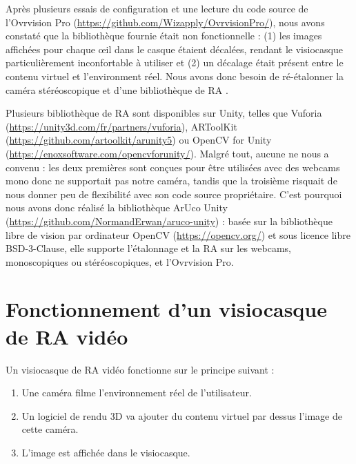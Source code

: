 Après plusieurs essais de configuration et une lecture du code source de l'Ovrvision Pro (\url{https://github.com/Wizapply/OvrvisionPro/}), nous avons constaté que la bibliothèque fournie était non fonctionnelle : (1) les images affichées pour chaque \oe il dans le casque étaient décalées, rendant le visiocasque particulièrement inconfortable à utiliser et (2) un décalage était présent entre le contenu virtuel et l'environment réel. Nous avons donc besoin de ré-étalonner la caméra stéréoscopique  et d'une bibliothèque de RA .

Plusieurs bibliothèque de RA sont disponibles sur Unity, telles que Vuforia (\url{https://unity3d.com/fr/partners/vuforia}), ARToolKit (\url{https://github.com/artoolkit/arunity5}) ou OpenCV for Unity (\url{https://enoxsoftware.com/opencvforunity/}). Malgré tout, aucune ne nous a convenu : les deux premières sont conçues pour être utilisées avec des webcams mono donc ne supportait pas notre caméra, tandis que la troisième risquait de nous donner peu de flexibilité avec son code source propriétaire. C'est pourquoi nous avons donc réalisé la bibliothèque ArUco Unity (\url{https://github.com/NormandErwan/aruco-unity}) : basée sur la bibliothèque libre de vision par ordinateur OpenCV (\url{https://opencv.org/}) et sous licence libre BSD-3-Clause, elle supporte l'étalonnage et la RA sur les webcams, monoscopiques ou stéréoscopiques, et l'Ovrvision Pro.


\section{Fonctionnement d'un visiocasque de RA vidéo}

Un visiocasque de RA vidéo fonctionne sur le principe suivant :
\begin{enumerate}
  \item Une caméra filme l'environnement réel de l'utilisateur.
  \item Un logiciel de rendu 3D va ajouter du contenu virtuel par dessus l'image de cette caméra.
  \item L'image est affichée dans le visiocasque.
\end{enumerate}



